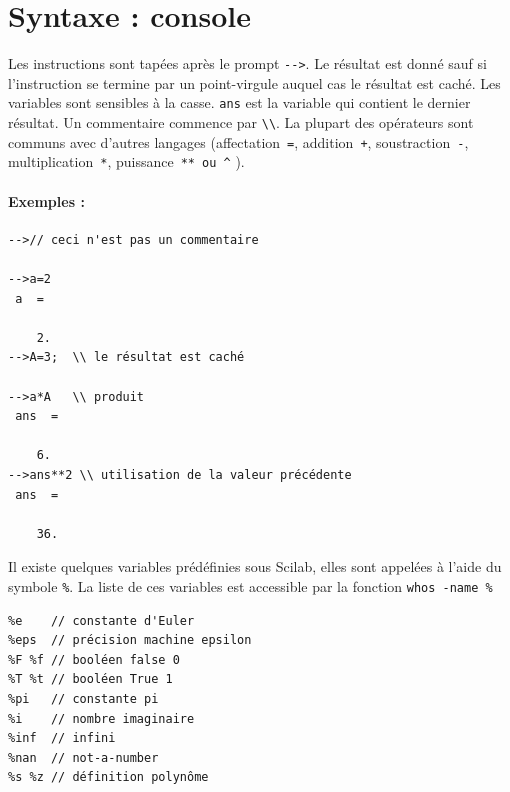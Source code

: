 \section{Syntaxe : console}
Les instructions sont tapées après le prompt \verb?-->?. Le résultat est donné 
sauf si l'instruction se termine par un point-virgule auquel cas le résultat 
est caché. Les variables sont sensibles à la casse. \verb?ans? est la variable 
qui contient le dernier résultat. Un commentaire commence par  \verb?\\?. 
La plupart des opérateurs sont communs avec d'autres langages 
(affectation~\verb?=?, addition~\verb?+?, soustraction~\verb?-?, 
multiplication~\verb?*?, puissance~\verb?** ou ^? ).

\paragraph{Exemples :}
\begin{code}
\begin{verbatim}
-->// ceci n'est pas un commentaire

-->a=2
 a  =
      
    2. 
-->A=3;  \\ le résultat est caché

-->a*A   \\ produit
 ans  =

    6.  
-->ans**2 \\ utilisation de la valeur précédente
 ans  =
  
    36.  
\end{verbatim}
\end{code}

Il existe quelques variables prédéfinies sous Scilab, elles sont appelées à 
l'aide du symbole \og\verb?%?\fg. La liste de ces variables est accessible 
par la fonction \verb?whos -name %?
\begin{code}
\begin{verbatim}
%e    // constante d'Euler
%eps  // précision machine epsilon
%F %f // booléen false 0 
%T %t // booléen True 1 
%pi   // constante pi
%i    // nombre imaginaire
%inf  // infini
%nan  // not-a-number
%s %z // définition polynôme
\end{verbatim}
\end{code}


